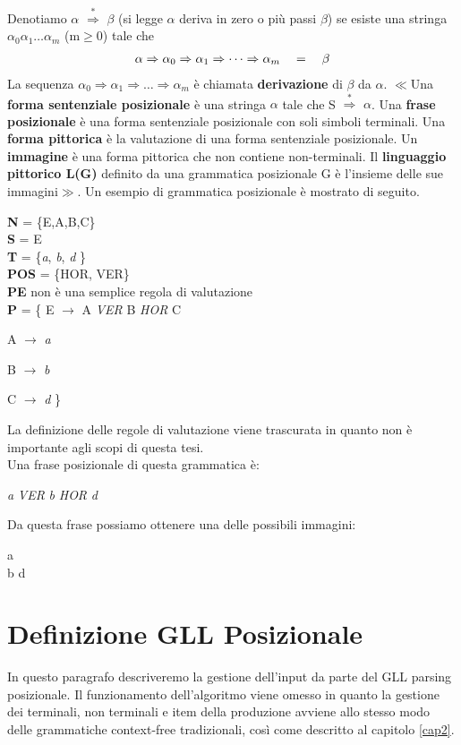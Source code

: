 Denotiamo $\alpha$ $\overset{*}{\Rightarrow}$ $\beta$ (si legge  $\alpha$ deriva in zero o più passi $\beta$) se esiste una stringa $\alpha_0$$\alpha_1$$\dots$$\alpha_m$ (m$\ge$0) tale che
\begin{align}
	\alpha \Rightarrow \alpha_0 \Rightarrow \alpha_1 \Rightarrow \dots \Rightarrow  \alpha_m \quad = \quad \beta  \notag
\end{align}
La sequenza $\alpha_0$$\Rightarrow$$\alpha_1$$\Rightarrow$$\dots$$\Rightarrow$$\alpha_m$ è chiamata \textbf{derivazione} di $\beta$ da $\alpha$. $\ll$Una \textbf{forma sentenziale posizionale} è una stringa $\alpha$ tale che S $\overset{*}{\Rightarrow}$ $\alpha$. Una \textbf{frase posizionale} è una forma sentenziale posizionale con soli simboli terminali. Una \textbf{forma pittorica} è la valutazione di una forma sentenziale posizionale. Un \textbf{immagine} è una forma pittorica che non contiene non-terminali. Il \textbf{linguaggio pittorico L(G)} definito da una grammatica posizionale G è l'insieme delle sue immagini$\gg$. Un esempio di grammatica posizionale è mostrato di seguito.
\begin{center}
	\textbf{N} = \{E,A,B,C\} \\
	\textbf{S} = E  \\
	\textbf{T} =  \{\textit{a}, \textit{b}, \textit{d} \} \\
	\textbf{POS}  = \{HOR, VER\}\\
	\textbf{PE} non è una semplice regola di valutazione\\
	\hspace{1.8cm}\textbf{P}  = \{ E $\to$ A \textit{VER} B \textit{HOR} C \par 
		A $\to$ \textit{a} \par 
	    B $\to$ \textit{b}  \par 
	    \hspace{0.3cm} C $\to$ \textit{d}  \}   
\end{center}
La definizione delle regole di valutazione viene trascurata in quanto non è importante agli scopi di questa tesi.\\
Una frase posizionale di questa grammatica è:
\begin{center}
	\textit{a} \textit{VER} \textit{b} \textit{HOR} \textit{d} 
\end{center}
Da questa frase possiamo ottenere una delle possibili immagini:
\begin{center}
	  a  \\ 
	 b \quad  d 
\end{center}
\section{Definizione GLL Posizionale}
In questo paragrafo descriveremo la gestione dell'input da parte del GLL parsing posizionale. Il funzionamento dell'algoritmo viene omesso in quanto la gestione dei terminali, non terminali e item della produzione avviene allo stesso modo delle grammatiche context-free tradizionali, così come descritto al capitolo \ref{cap2}.
